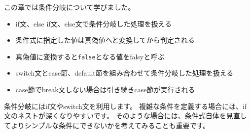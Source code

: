 この章では条件分岐について学びました。

\begin{itemize}
\item
  if文、else if文、else文で条件分岐した処理を扱える
\item
  条件式に指定した値は真偽値へと変換してから判定される
\item
  真偽値に変換すると\texttt{false}となる値をfalsyと呼ぶ
\item
  switch文とcase節、default節を組み合わせて条件分岐した処理を扱える
\item
  case節でbreak文しない場合は引き続きcase節が実行される
\end{itemize}

条件分岐にはif文やswitch文を利用します。
複雑な条件を定義する場合には、if文のネストが深くなりやすいです。
そのような場合には、条件式自体を見直してよりシンプルな条件にできないかを考えてみることも重要です。

